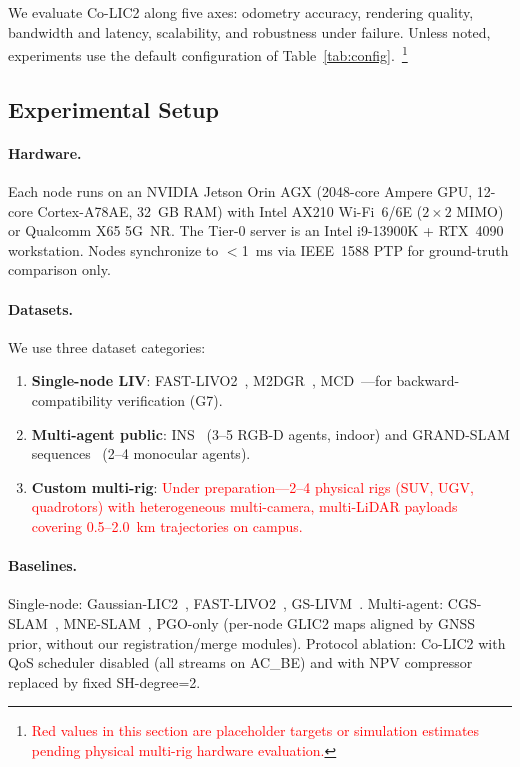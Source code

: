 \label{sec:experiments}

We evaluate Co-LIC2 along five axes: odometry accuracy, rendering quality,
bandwidth and latency, scalability, and robustness under failure. Unless
noted, experiments use the default configuration of
Table~\ref{tab:config}.~\footnote{\textcolor{red}{Red values in this section
are placeholder targets or simulation estimates pending physical multi-rig
hardware evaluation.}}

\subsection{Experimental Setup}

\paragraph{Hardware.} Each node runs on an NVIDIA Jetson Orin AGX (2048-core
Ampere GPU, 12-core Cortex-A78AE, 32~GB RAM) with Intel AX210 Wi-Fi~6/6E
($2\times2$ MIMO) or Qualcomm X65 5G~NR. The Tier-0 server is an Intel
i9-13900K + RTX~4090 workstation. Nodes synchronize to $<$1~ms via IEEE~1588
PTP for ground-truth comparison only.

\paragraph{Datasets.} We use three dataset categories:
\begin{enumerate}
  \item \textbf{Single-node LIV}: FAST-LIVO2~\cite{zheng2024fastlivo2_mob},
    M2DGR~\cite{yin2022m2dgr}, MCD~\cite{nguyen2024mcd}---for backward-
    compatibility verification (G7).
  \item \textbf{Multi-agent public}: INS~\cite{deng2025mneslam} (3--5 RGB-D
    agents, indoor) and GRAND-SLAM sequences~\cite{thomas2025grandslam_mob}
    (2--4 monocular agents).
  \item \textbf{Custom multi-rig}: \textcolor{red}{Under preparation---2--4
    physical rigs (SUV, UGV, quadrotors) with heterogeneous multi-camera,
    multi-LiDAR payloads covering 0.5--2.0~km trajectories on campus.}
\end{enumerate}

\paragraph{Baselines.} Single-node: Gaussian-LIC2~\cite{lang2026gaussian2_mob},
FAST-LIVO2~\cite{zheng2024fastlivo2_mob}, GS-LIVM~\cite{xie2025gslivm}.
Multi-agent: CGS-SLAM~\cite{deambrogi2026cgsslam_mob},
MNE-SLAM~\cite{deng2025mneslam}, PGO-only (per-node GLIC2 maps aligned by
GNSS prior, without our registration/merge modules). Protocol ablation:
Co-LIC2 with QoS scheduler disabled (all streams on AC\_BE) and with NPV
compressor replaced by fixed SH-degree=2.

